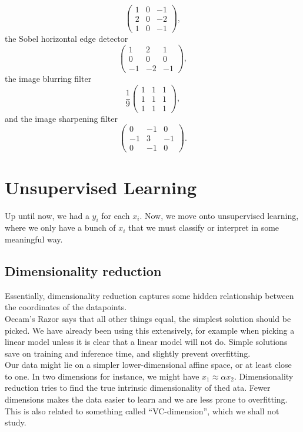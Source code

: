 \documentclass{article}
\begin{document}
		\[
			\begin{pmatrix}
				1 & 0 & -1 \\
				2 & 0 & -2 \\
				1 & 0 & -1
			\end{pmatrix},
		\]
		the Sobel horizontal edge detector
		\[
			\begin{pmatrix}
				1 & 2 & 1 \\
				0 & 0 & 0 \\
				-1 & -2 & -1
			\end{pmatrix},
		\]
		the image blurring filter
		\[
			\frac{1}{9}
			\begin{pmatrix}
				1 & 1 & 1 \\
				1 & 1 & 1 \\
				1 & 1 & 1
			\end{pmatrix},
		\]
		and the image sharpening filter
		\[
			\begin{pmatrix}
				0 & -1 & 0 \\
				-1 & 3 & -1 \\
				0 & -1 & 0
			\end{pmatrix}.
		\]



\clearpage

\section{Unsupervised Learning}

	Up until now, we had a $y_i$ for each $x_i$. Now, we move onto unsupervised learning, where we only have a bunch of $x_i$ that we must classify or interpret in some meaningful way.

	\subsection{Dimensionality reduction}

		Essentially, dimensionality reduction captures some hidden relationship between the coordinates of the datapoints.\\

		Occam's Razor says that all other things equal, the simplest solution should be picked. We have already been using this extensively, for example when picking a linear model unless it is clear that a linear model will not do. Simple solutions save on training and inference time, and slightly prevent overfitting.\\
		Our data might lie on a simpler lower-dimensional affine space, or at least close to one. In two dimensions for instance, we might have $x_1 \approx \alpha x_2$. Dimensionality reduction tries to find the true intrinsic dimensionality of thed ata. Fewer dimensions makes the data easier to learn and we are less prone to overfitting.\\
		This is also related to something called ``VC-dimension'', which we shall not study.\\
\end{document}
